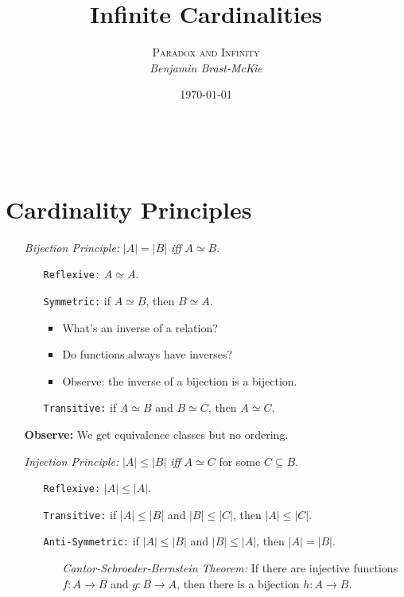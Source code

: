 \documentclass[a4paper, 11pt]{article} %
\title{\textbf{Infinite Cardinalities}} %
\author{\textsc{Paradox and Infinity}\\ \em Benjamin Brast-McKie} %
\date{\today} %
\makeatletter
\newcommand{\abs}[1]{|#1|} %
\renewcommand{\maketitle}{ %
\begin{flushright} %
{\LARGE\@title} %

\vspace{10pt} %

{\@author} %
\\\@date %

\vspace{-30pt} %
\end{flushright}
}
\makeatother
\begin{document}
\maketitle %

\thispagestyle{empty}



\section*{Cardinality Principles}

\begin{enumerate}
  \item[\it Bijection Principle:] $\abs{A}=\abs{B}$ \textit{iff} $A\simeq B$. 
    \begin{itemize}
      \item[\tt Reflexive:] $A \simeq A$.
      \item[\tt Symmetric:] if $A \simeq B$, then $B \simeq A$.
      \begin{itemize}[leftmargin=-.5in]
        \item What's an inverse of a relation?
        \item Do functions always have inverses?
        \item Observe: the inverse of a bijection is a bijection.
      \end{itemize}
      \item[\tt Transitive:] if $A \simeq B$ and $B \simeq C$, then $A \simeq C$.
    \end{itemize}
  \item[\bf Observe:] We get equivalence classes but no ordering.
  \item[\it Injection Principle:] $\abs{A} \leq \abs{B}$ \textit{iff} $A \simeq C$ for some $C\subseteq B$. 
    \begin{itemize}
      \item[\tt Reflexive:] $|A| \leq |A|$.
      \item[\tt Transitive:] if $|A| \leq |B|$ and $|B| \leq |C|$, then $|A| \leq |C|$.
      \item[\tt Anti-Symmetric:] if $|A| \leq |B|$ and $|B| \leq |A|$, then $|A| = |B|$.
        \begin{itemize}[leftmargin=.5in]
          \item[\it Cantor-Schroeder-Bernstein Theorem:] If there are injective functions $f: A \to B$ and $g: B \to A$, then there is a bijection $h: A \to B$. 

\end{itemize}
\end{itemize}
\end{enumerate}
\end{document}
